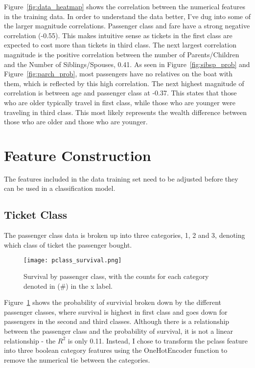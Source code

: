 \documentclass[12pt, letterpaper]{article}
\begin{document}
Figure~\ref{fig:data_heatmap} shows the correlation between the numerical features in the training data. In order to understand the data better, I've dug into some of the larger magnitude correlations. Passenger class and fare have a strong negative correlation (-0.55). This makes intuitive sense as tickets in the first class are expected to cost more than tickets in third class. The next largest correlation magnitude is the positive correlation between the number of Parents/Children and the Number of Siblings/Spouses, 0.41. As seen in Figure~\ref{fig:sibsp_prob} and Figure~\ref{fig:parch_prob}, most passengers have no relatives on the boat with them, which is reflected by this high correlation. The next highest magnitude of correlation is between age and passenger class at -0.37. This states that those who are older typically travel in first class, while those who are younger were traveling in third class. This most likely represents the wealth difference between those who are older and those who are younger.

\section{Feature Construction} \label{feature_construction}

The features included in the data training set need to be adjusted before they can be used in a classification model.

\subsection{Ticket Class}

The passenger class data is broken up into three categories, 1, 2 and 3, denoting which class of ticket the passenger bought.

\begin{figure}[H]
    \centering
    \texttt{[image: pclass\_survival.png]}
    \caption{Survival by passenger class, with the counts for each category denoted in (\#) in the x label. }
    \label{fig:pclass_prob}
\end{figure}

Figure~\ref{fig:pclass_prob} shows the probability of survivial broken down by the different passenger classes, where survival is highest in first class and goes down for passengers in the second and third classes. Although there is a relationship between the passenger class and the probability of survival, it is not a linear relationship - the \(R^2\) is only 0.11. Instead, I chose to transform the pclass feature into three boolean category features using the OneHotEncoder function to remove the numerical tie between the categories.
\end{document}
